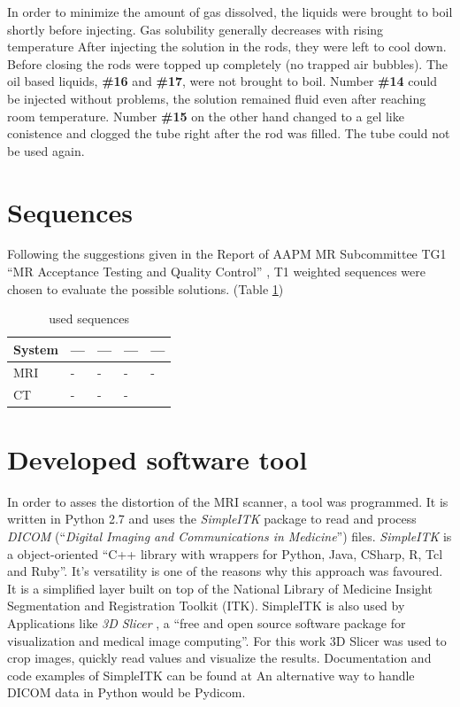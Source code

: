 \documentclass[parskip,bibtotoc,final,twoside=false,titlepage,a4paper,english,12pt,titlepage,a4paper]{scrbook}
\begin{document}
In order to minimize the amount of gas dissolved, the liquids were brought to boil shortly before injecting. Gas solubility generally decreases with rising temperature \cite{Henry1803, Sander2015}
After injecting the solution in the rods, they were left to cool down. Before closing the rods were topped up completely (no trapped air bubbles).
The oil based liquids, \textbf{\#16} and \textbf{\#17}, were not brought to boil.
Number \textbf{\#14} could be injected without problems, the solution remained fluid even after reaching room temperature.
Number \textbf{\#15} on the other hand changed to a gel like conistence and clogged the tube right after the rod was filled. The tube could not be used again.



\section{Sequences}

Following the suggestions given in the Report of AAPM MR Subcommittee TG1 ``MR Acceptance Testing and
Quality Control'' \cite{Jackson2009}, T1 weighted sequences were chosen to evaluate the possible solutions. (Table \ref{tab:settings})

\begin{table}[h]
\centering
\begin{tabular}{@{}lllll@{}}
System & ---  & --- &  --- & --- \\
\toprule
MRI    & -   & -   & -   & -    \\
CT     & -   & -   & -   &
\end{tabular}
\caption{used sequences}
\label{tab:settings}
\end{table}

\section{Developed software tool}

In order to asses the distortion of the MRI scanner, a tool was programmed.
It is written in Python 2.7 and uses the \textit{SimpleITK} package to read and process \textit{DICOM} (``\textit{Digital Imaging and Communications in Medicine}'') files. \cite{Python, DICOM}
\textit{SimpleITK} is a object-oriented ``C++ library with wrappers for Python, Java, CSharp, R, Tcl and Ruby''. \cite{SimpleITK, SimpleITK_started} It's versatility is one of the reasons why this approach was favoured.
It is a simplified layer built on top of the National Library of Medicine Insight Segmentation and Registration Toolkit (ITK). SimpleITK is also used by Applications like \textit{3D Slicer} , a ``free and open source software package for
visualization and medical image computing''. \cite{3DSlicer, Kikinis2012} For this work 3D Slicer was used to crop images, quickly read values and visualize the results.
Documentation and code examples of SimpleITK can be found at \cite{InsightSoftwareConsortium, Kyriakou-SimpleITK}
An alternative way to handle DICOM data in Python would be Pydicom. \cite{Pydicom, Kyriakou-Pydicom-VTK} 
\end{document}
